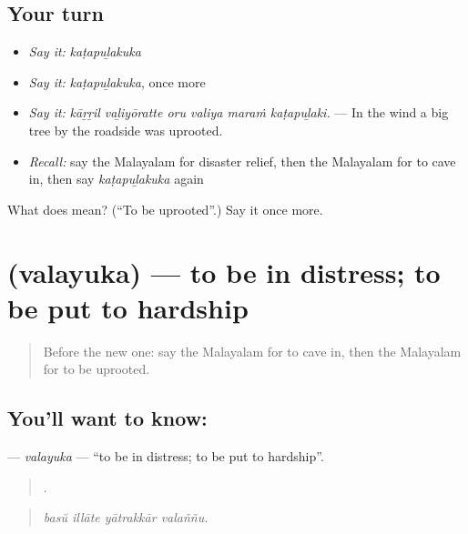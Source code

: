 \subsection*{Your turn}
\begin{itemize}
\raggedright
  \item \emph{Say it:} \emph{kaṭapuḻakuka}
  \item \emph{Say it:} \emph{kaṭapuḻakuka}, once more
  \item \emph{Say it:} \emph{kāṟṟil vaḻiyōratte oru valiya maraṁ kaṭapuḻaki.} — In the wind a big tree by the roadside was uprooted.
  \item \emph{Recall:} say the Malayalam for disaster relief, then the Malayalam for to cave in, then say \emph{kaṭapuḻakuka} again
\end{itemize}

\begin{tcolorbox}[breakable,colback=teal!4,colframe=teal!35!black,title={Before you move on}]
What does  mean? (\textquotedblleft{}To be uprooted\textquotedblright{}.) Say it once more.
\end{tcolorbox}
\section[\texorpdfstring{\ml{വലയുക} (valayuka)}{വലയുക (valayuka)}]{ (valayuka) — to be in distress; to be put to hardship}

\label{lesson:ML-C513-valayuka}



\begin{quote}
Before the new one: say the Malayalam for to cave in, then the Malayalam for to be uprooted.
\end{quote}

\subsection*{You'll want to know: }
\textbf{} — \emph{valayuka} — \textquotedblleft{}to be in distress; to be put to hardship\textquotedblright{}.

\begin{quote}
   .
\end{quote}

\begin{quote}
\emph{basŭ illāte yātrakkār valaññu.}
\end{quote}

